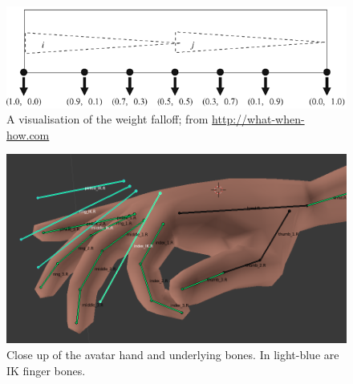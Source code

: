 \documentclass[12pt]{ociamthesis}  %
\begin{document}
\begin{figure}[H]
	\centering
    \includegraphics[scale=0.5]{chapter4/weights}
    \caption[A visualisation of the weight falloff]{A visualisation of the weight falloff; from \url{http://what-when-how.com}}
    \label{fig:weights}
\end{figure}	

\begin{figure}[H]
	\centering
    \includegraphics[scale=0.4]{chapter4/hand-zoom}
    \caption[Close up of the avatar hand and underlying bones]{Close up of the avatar hand and underlying bones. In light-blue are IK finger bones.}
    \label{fig:hand}
\end{figure}	
\end{document}
